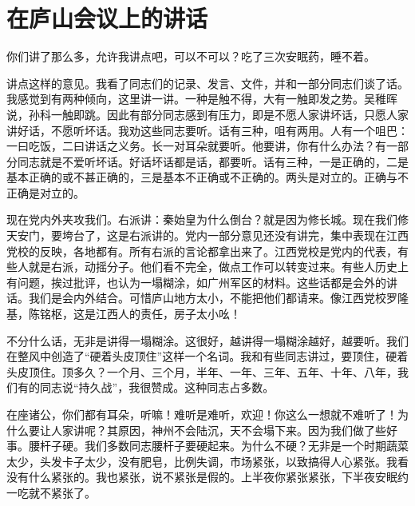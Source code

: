 \section[在庐山会议上的讲话（一九五九年七月二十三日）]{在庐山会议上的讲话}


你们讲了那么多，允许我讲点吧，可以不可以？吃了三次安眠药，睡不着。

讲点这样的意见。我看了同志们的记录、发言、文件，并和一部分同志们谈了话。我感觉到有两种倾向，这里讲一讲。一种是触不得，大有一触即发之势。吴稚晖说，孙科一触即跳。因此有部分同志感到有压力，即是不愿人家讲坏话，只愿人家讲好话，不愿听坏话。我劝这些同志要听。话有三种，咀有两用。人有一个咀巴：一曰吃饭，二曰讲话之义务。长一对耳朵就要听。他要讲，你有什么办法？有一部分同志就是不爱听坏话。好话坏话都是话，都要听。话有三种，一是正确的，二是基本正确的或不甚正确的，三是基本不正确或不正确的。两头是对立的。正确与不正确是对立的。

现在党内外夹攻我们。右派讲：秦始皇为什么倒台？就是因为修长城。现在我们修天安门，要垮台了，这是右派讲的。党内一部分意见还没有讲完，集中表现在江西党校的反映，各地都有。所有右派的言论都拿出来了。江西党校是党内的代表，有些人就是右派，动摇分子。他们看不完全，做点工作可以转变过来。有些人历史上有问题，挨过批评，也认为一塌糊涂，如广州军区的材料。这些话都是会外的讲话。我们是会内外结合。可惜庐山地方太小，不能把他们都请来。像江西党校罗隆基，陈铭枢，这是江西人的责任，房子太小吆！

不分什么话，无非是讲得一塌糊涂。这很好，越讲得一塌糊涂越好，越要听。我们在整风中创造了“硬着头皮顶住”这样一个名词。我和有些同志讲过，要顶住，硬着头皮顶住。顶多久？一个月、三个月，半年、一年、三年、五年、十年、八年，我们有的同志说“持久战”，我很赞成。这种同志占多数。

在座诸公，你们都有耳朵，听嘛！难听是难听，欢迎！你这么一想就不难听了！为什么要让人家讲呢？其原因，神州不会陆沉，天不会塌下来。因为我们做了些好事。腰杆子硬。我们多数同志腰杆子要硬起来。为什么不硬？无非是一个时期蔬菜太少，头发卡子太少，没有肥皂，比例失调，市场紧张，以致搞得人心紧张。我看没有什么紧张的。我也紧张，说不紧张是假的。上半夜你紧张紧张，下半夜安眠约一吃就不紧张了。

